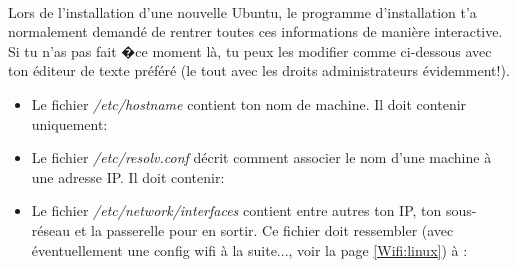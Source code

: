 \paragraph{}
\label{Ubuntu:IP}

Lors de l'installation d'une nouvelle Ubuntu, le programme d'installation t'a normalement demand\'e de rentrer toutes ces informations de mani\`ere interactive. Si tu n'as pas fait �ce moment l\`a, tu peux les modifier comme ci-dessous avec ton \'editeur de texte pr\'ef\'er\'e (le tout avec les droits administrateurs \'evidemment!).

\begin{itemize}
\item Le fichier \emph{/etc/hostname} contient ton nom de machine. Il doit contenir uniquement:


\item Le fichier \emph{/etc/resolv.conf} d\'ecrit comment associer le nom d'une machine \`a une adresse IP.
Il doit contenir:


\item Le fichier \emph{/etc/network/interfaces} contient entre autres ton IP,
ton sous-r\'eseau et la passerelle pour en sortir.
Ce fichier doit ressembler (avec \'eventuellement une config wifi \`a la suite...,
voir la page \ref{Wifi:linux}) \`a : 


\end{itemize}

